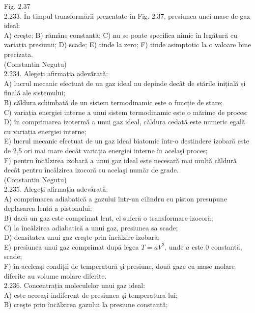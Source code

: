 \documentclass[10pt]{article}
\begin{document}
Fig. 2.37\\
2.233. În timpul transformării prezentate în Fig. 2.37, presiunea unei mase de gaz ideal:\\
A) creşte; B) rămâne constantă; C) nu se poate specifica nimic în legătură cu variația presiunii; D) scade; E) tinde la zero; F) tinde asimptotic la o valoare bine precizata.\\
(Constantin Negutu)\\
2.234. Alegeți afirmația adevărată:\\
A) lucrul mecanic efectuat de un gaz ideal nu depinde decât de stările inițială și finală ale sistemului;\\
B) căldura schimbată de un sistem termodinamic este o funcție de stare;\\
C) variația energiei interne a unui sistem termodinamic este o mărime de proces:\\
D) în comprimarea izotermă a unui gaz ideal, cǎldura cedată este numeric egală cu variația energiei interne;\\
E) lucrul mecanic efectuat de un gaz ideal biatomic într-o destindere izobară este de 2,5 ori mai mare decât variația energiei interne în acelaşi proces;\\
F) pentru încălzirea izobară a unui gaz ideal este necesară mai multă căldură decât pentru încălzirea izocoră cu acelaşi număr de grade.\\
(Constantin Neguțu)\\
2.235. Alegeți afirmația adevărată:\\
A) comprimarea adiabatică a gazului într-un cilindru cu piston presupune deplasarea lentă a pistonului;\\
B) dacă un gaz este comprimat lent, el suferă o transformare izocoră;\\
C) la încălzirea adiabatică a unui gaz, presiunea sa scade;\\
D) densitatea unui gaz creşte prin încălzire izobară;\\
E) presiunea unui gaz comprimat după legea $T=a V^{2}$, unde $a$ este 0 constantă, scade;\\
F) în aceleaşi condiții de temperatură şi presiune, două gaze cu mase molare diferite au volume molare diferite.\\
2.236. Concentrația moleculelor unui gaz ideal:\\
A) este aceeaşi indiferent de presiunea şi temperatura lui;\\
B) creşte prin încălzirea gazului la presiune constantă;\\
\end{document}
